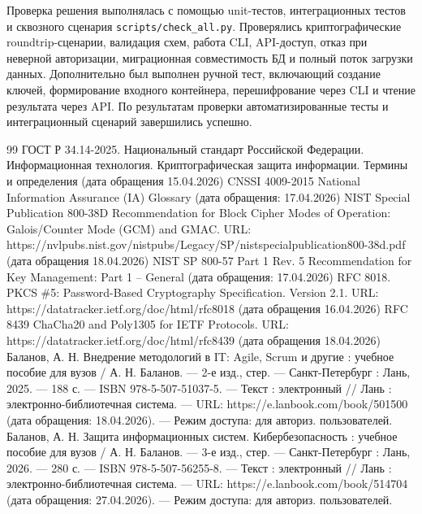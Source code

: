 \documentclass[14pt, a4paper]{extarticle}
\begin{document}
	Проверка решения выполнялась с помощью unit-тестов, интеграционных тестов и сквозного сценария \texttt{scripts/check\_all.py}. Проверялись криптографические roundtrip-сценарии, валидация схем, работа CLI, API-доступ, отказ при неверной авторизации, миграционная совместимость БД и полный поток загрузки данных. Дополнительно был выполнен ручной тест, включающий создание ключей, формирование входного контейнера, перешифрование через CLI и чтение результата через API. По результатам проверки автоматизированные тесты и интеграционный сценарий завершились успешно.

%	
	\newpage
	\vspace{0.3cm}
	\begin{thebibliography}{99}
	ГОСТ Р 34.14-2025. Национальный стандарт Российской Федерации. Информационная технология. Криптографическая защита информации. Термины и определения (дата обращения 15.04.2026)
	CNSSI 4009-2015 National Information Assurance (IA) Glossary (дата обращения: 17.04.2026)
	NIST Special Publication 800-38D Recommendation for Block Cipher Modes of Operation: Galois/Counter Mode (GCM) and GMAC. URL: https://nvlpubs.nist.gov/nistpubs/Legacy/SP/nistspecialpublication800-38d.pdf (дата обращения 18.04.2026)
	NIST SP 800-57 Part 1 Rev. 5 Recommendation for Key Management: Part 1 – General (дата обращения: 17.04.2026)
	RFC 8018. PKCS \#5: Password-Based Cryptography Specification. Version 2.1. URL: https://datatracker.ietf.org/doc/html/rfc8018 (дата обращения 16.04.2026)
	RFC 8439 ChaCha20 and Poly1305 for IETF Protocols. URL: https://datatracker.ietf.org/doc/html/rfc8439 (дата обращения 18.04.2026)
	Баланов, А. Н. Внедрение методологий в IT: Agile, Scrum и другие : учебное пособие для вузов / А. Н. Баланов. — 2-е изд., стер. — Санкт-Петербург : Лань, 2025. — 188 с. — ISBN 978-5-507-51037-5. — Текст : электронный // Лань : электронно-библиотечная система. — URL: https://e.lanbook.com/book/501500 (дата обращения: 18.04.2026). — Режим доступа: для авториз. пользователей.
	Баланов, А. Н. Защита информационных систем. Кибербезопасность : учебное пособие для вузов / А. Н. Баланов. — 3-е изд., стер. — Санкт-Петербург : Лань, 2026. — 280 с. — ISBN 978-5-507-56255-8. — Текст : электронный // Лань : электронно-библиотечная система. — URL: https://e.lanbook.com/book/514704 (дата обращения: 27.04.2026). — Режим доступа: для авториз. пользователей.

\end{thebibliography}
\end{document}
